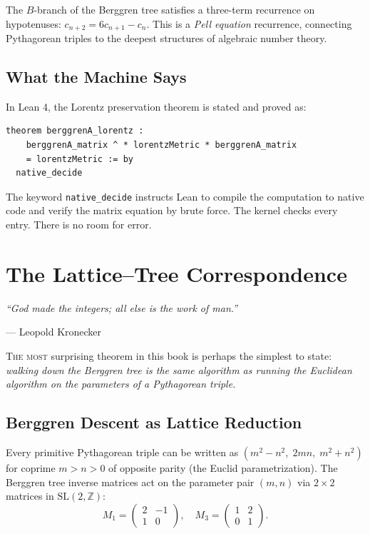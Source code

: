 \documentclass[11pt,twoside,openright]{book}
\theoremstyle{definition}
\newcommand{\Z}{\mathbb{Z}}
\begin{document}
\begin{insightbox}
The $B$-branch of the Berggren tree satisfies a three-term recurrence
on hypotenuses: $c_{n+2} = 6c_{n+1} - c_n$. This is a \emph{Pell
equation} recurrence, connecting Pythagorean triples to the deepest
structures of algebraic number theory.
\end{insightbox}

\section{What the Machine Says}

In Lean 4, the Lorentz preservation theorem is stated and proved as:

\begin{lstlisting}[caption={Berggren--Lorentz preservation (machine-verified)}]
theorem berggrenA_lorentz :
    berggrenA_matrix ^ * lorentzMetric * berggrenA_matrix
    = lorentzMetric := by
  native_decide
\end{lstlisting}

The keyword \texttt{native\_decide} instructs Lean to compile the
computation to native code and verify the matrix equation by brute force.
The kernel checks every entry. There is no room for error.

\chapter{The Lattice--Tree Correspondence}
\label{ch:lattice-tree}

\epigraph{\itshape ``God made the integers; all else is the work of man.''}
{--- Leopold Kronecker}

\lettrine[lines=3]{T}{he most} surprising theorem in this book is perhaps the
simplest to state: \emph{walking down the Berggren tree is the same algorithm
as running the Euclidean algorithm on the parameters of a Pythagorean triple.}

\section{Berggren Descent as Lattice Reduction}

Every primitive Pythagorean triple can be written as
$(m^2-n^2,\; 2mn,\; m^2+n^2)$ for coprime $m > n > 0$ of opposite parity
(the Euclid parametrization). The Berggren tree inverse matrices act on
the parameter pair $(m,n)$ via $2\times 2$ matrices in $\mathrm{SL}(2,\Z)$:
\[
M_1 = \begin{pmatrix} 2 & -1 \\ 1 & 0 \end{pmatrix},\quad
M_3 = \begin{pmatrix} 1 & 2 \\ 0 & 1 \end{pmatrix}.
\]
\end{document}
